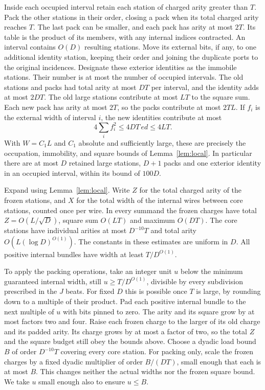 Inside each occupied interval retain each station of charged arity greater
than $T$. Pack the other stations in their order, closing a pack
when its total charged arity reaches $T$. The last pack can be smaller,
and each pack has arity at most $2T$. Its table is the product of its
members, with any internal indices contracted. An interval contains
$O(D)$ resulting stations. Move its external bits, if any, to one
additional identity station, keeping their order and joining the duplicate
ports to the original incidences. Designate these exterior identities as the immobile stations. Their number is at most the number of occupied intervals. The old stations and packs had total arity at most $DT$ per interval, and the identity adds at most $2DT$. The old large stations contribute at most $LT$ to the square sum. Each new pack has arity at most $2T$, so the packs contribute at most $2TL$.
If $f_i$ is the external width of interval $i$, the new identities
contribute at most
\[
 4\sum_i f_i^2\le 4DT\,ed\le 4LT .
\]
With $W=C_1L$ and $C_1$ absolute and sufficiently large, these are
precisely the occupation, immobility, and square bounds of
Lemma~\ref{lem:local}. In particular there are at most $D$ retained large stations, $D+1$ packs and one exterior identity in an occupied interval, within its bound of $100D$.

Expand using Lemma~\ref{lem:local}. Write $Z$ for the total charged
arity of the frozen stations, and $X$ for the total width of the
internal wires between core stations, counted once per wire. In every
summand the frozen charges have total $Z=O(L/\sqrt D)$, square sum
$O(LT)$ and maximum $O(DT)$. The core stations have individual arities
at most $D^{-10}T$ and total arity $O(L(\log D)^{O(1)})$.
The constants in these estimates are uniform in $D$. All positive
internal bundles have width at least $T/D^{O(1)}$.

To apply the packing operations, take an integer unit $u$ below the
minimum guaranteed internal width, still $u\ge T/D^{O(1)}$, divisible
by every subdivision prescribed in the $J$ beats. For fixed $D$ this is
possible once $T$ is large, by rounding down to a multiple of their
product. Pad each positive internal bundle to the next multiple of $u$
with bits pinned to zero. The arity and its square grow by at most
factors two and four. Raise each frozen charge to the larger of its old charge and its padded arity. Its charge grows by at most a factor of two, so the total $Z$ and the square budget still obey the bounds above. Choose a dyadic load bound $B$ of order
$D^{-10}T$ covering every core station. For packing only, scale the
frozen charges by a fixed dyadic multiplier of order $B/(DT)$, small
enough that each is at most $B$. This changes neither the actual widths
nor the frozen square bound. We take $u$ small enough also to ensure $u\le B$.

